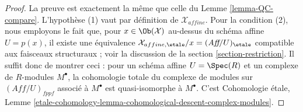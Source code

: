 \begin{proof}
La preuve est exactement la même que celle du Lemme \ref{lemma-QC-compare}.
L'hypothèse (1) vaut par définition de $\mathcal{X}_{affine}$.
Pour la condition (2), nous employons le fait que, pour $x \in \Ob(\mathcal{X})$
au-dessus du schéma affine $U = p(x)$, il existe une équivalence
$\mathcal{X}_{affine, \etale}/x = (\textit{Aff}/U)_\etale$ compatible
aux faisceaux structuraux ; voir la
discussion de la section \ref{section-restriction}.
Il suffit donc de montrer ceci : pour un schéma affine $U = \Spec(R)$
et un complexe de $R$-modules $M^\bullet$, la cohomologie totale
du complexe de modules sur $(\textit{Aff}/U)_{fppf}$
associé à $M^\bullet$ est quasi-isomorphe à $M^\bullet$.
C'est Cohomologie \'etale, Lemme
\ref{etale-cohomology-lemma-cohomological-descent-complex-modules}.
\end{proof}
















